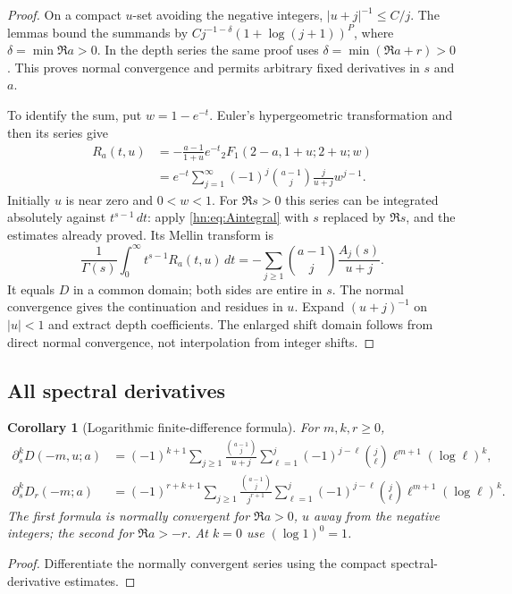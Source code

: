 \documentclass[11pt,a4paper]{article}
\numberwithin{equation}{section}
\newtheorem{corollary}[theorem]{Corollary}
\theoremstyle{definition}
\theoremstyle{remark}
\begin{document}
\begin{proof}
On a compact $u$-set avoiding the negative integers,
$|u+j|^{-1}\le C/j$. The lemmas bound the summands by
$Cj^{-1-\delta}(1+\log(j+1))^P$, where
$\delta=\min\Re a>0$. In the depth series the same proof uses
$\delta=\min(\Re a+r)>0$. This proves normal convergence and
permits arbitrary fixed derivatives in $s$ and $a$.

To identify the sum, put $w=1-e^{-t}$. Euler's hypergeometric
transformation \cite{DLMFHypergeom} and then its series give
\begin{align*}
 R_a(t,u)
 &=-\frac{a-1}{1+u}e^{-t}
       {}_2F_1(2-a,1+u;2+u;w)\\
 &=e^{-t}\sum_{j=1}^\infty
        (-1)^j\binom{a-1}{j}\frac{j}{u+j}w^{j-1}.
\end{align*}
Initially $u$ is near zero and $0<w<1$. For $\Re s>0$ this
series can be integrated absolutely against $t^{s-1}\,dt$:
apply \eqref{hn:eq:Aintegral} with $s$ replaced by $\Re s$,
and the estimates already proved. Its Mellin transform is
\[
 \frac1{\Gamma(s)}\int_0^\infty t^{s-1}R_a(t,u)\,dt
 =-\sum_{j\ge1}\binom{a-1}{j}\frac{A_j(s)}{u+j}.
\]
It equals $D$ in a common domain; both sides are entire in $s$.
The normal convergence gives the continuation and residues in $u$.
Expand $(u+j)^{-1}$ on $|u|<1$ and extract depth coefficients.
The enlarged shift domain follows from direct normal convergence,
not interpolation from integer shifts.
\end{proof}

\subsection{All spectral derivatives}

\begin{corollary}[Logarithmic finite-difference formula]\label{hn:cor:jets}
For $m,k,r\ge0$,
\begin{align}
 \partial_s^kD(-m,u;a)
 &=(-1)^{k+1}\sum_{j\ge1}\frac{\binom{a-1}{j}}{u+j}
       \sum_{\ell=1}^j(-1)^{j-\ell}\binom j\ell
                     \ell^{m+1}(\log\ell)^k,
 \label{hn:eq:spectral-full}\\
 \partial_s^kD_r(-m;a)
 &=(-1)^{r+k+1}\sum_{j\ge1}\frac{\binom{a-1}{j}}{j^{r+1}}
       \sum_{\ell=1}^j(-1)^{j-\ell}\binom j\ell
                     \ell^{m+1}(\log\ell)^k.
 \label{hn:eq:spectral-depth}
\end{align}
The first formula is normally convergent for $\Re a>0$, $u$ away
from the negative integers; the second for $\Re a>-r$.
At $k=0$ use $(\log1)^0=1$.
\end{corollary}
\begin{proof}
Differentiate the normally convergent series using the compact
spectral-derivative estimates.
\end{proof}
\end{document}
